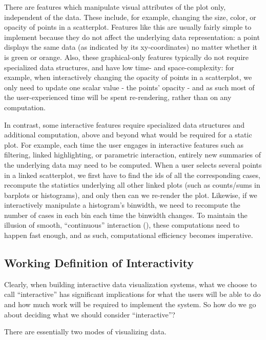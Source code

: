 \documentclass[
]{book}
\theoremstyle{definition}
\theoremstyle{definition}
\theoremstyle{definition}
\theoremstyle{definition}
\theoremstyle{remark}
\begin{document}
There are features which manipulate visual attributes of the plot only, independent of the data. These include, for example, changing the size, color, or opacity of points in a scatterplot. Features like this are usually fairly simple to implement because they do not affect the underlying data representation: a point displays the same data (as indicated by its xy-coordinates) no matter whether it is green or orange. Also, these graphical-only features typically do not require specialized data structures, and have low time- and space-complexity: for example, when interactively changing the opacity of points in a scatterplot, we only need to update one scalar value - the points' opacity - and as such most of the user-experienced time will be spent re-rendering, rather than on any computation.

In contrast, some interactive features require specialized data structures and additional computation, above and beyond what would be required for a static plot. For example, each time the user engages in interactive features such as filtering, linked highlighting, or parametric interaction, entirely new summaries of the underlying data may need to be computed. When a user selects several points in a linked scatterplot, we first have to find the ids of all the corresponding cases, recompute the statistics underlying all other linked plots (such as counts/sums in barplots or histograms), and only then can we re-render the plot. Likewise, if we interactively manipulate a histogram's binwidth, we need to recompute the number of cases in each bin each time the binwidth changes. To maintain the illusion of smooth, ``continuous'' interaction (), these computations need to happen fast enough, and as such, computational efficiency becomes imperative.

\subsection{Working Definition of Interactivity}\label{working-definition-of-interactivity}

Clearly, when building interactive data visualization systems, what we choose to call ``interactive'' has significant implications for what the users will be able to do and how much work will be required to implement the system. So how do we go about deciding what we should consider ``interactive''?

There are essentially two modes of visualizing data.
\end{document}
